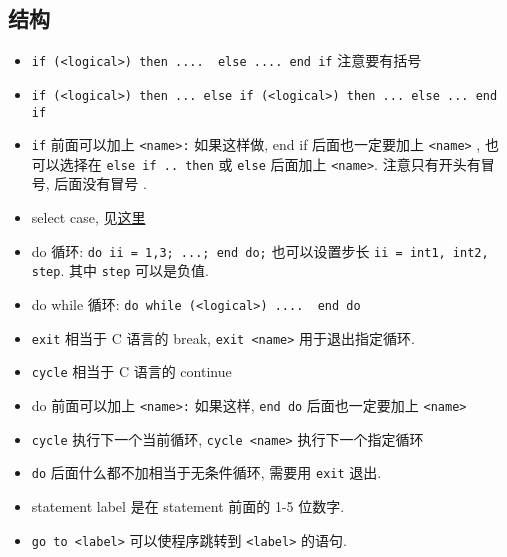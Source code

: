 \subsection{结构}
\begin{itemize}
\item \verb`if (<logical>) then ....  else .... end if` 注意要有括号
\item \verb`if (<logical>) then ... else if (<logical>) then ... else ... end if`
\item \verb`if` 前面可以加上 \verb`<name>:` 如果这样做,  end if 后面也一定要加上 \verb`<name>`  , 也可以选择在 \verb`else if .. then` 或 \verb`else` 后面加上 \verb`<name>`. 注意只有开头有冒号, 后面没有冒号 .
\item select case, 见\href{http://www.tutorialspoint.com/fortran/select_case_construct.htm}{这里}
\item do 循环:   \verb`do ii = 1,3; ...; end do;` 也可以设置步长 \verb`ii = int1, int2, step`. 其中 \verb`step` 可以是负值.
\item do while 循环: \verb`do while (<logical>) ....  end do`
\item \verb`exit` 相当于 C 语言的 break, \verb`exit <name>` 用于退出指定循环.
\item \verb`cycle` 相当于 C 语言的 continue
\item do 前面可以加上 \verb`<name>:` 如果这样, \verb`end do` 后面也一定要加上 \verb`<name>`
\item \verb`cycle` 执行下一个当前循环, \verb`cycle <name>` 执行下一个指定循环
\item \verb`do` 后面什么都不加相当于无条件循环, 需要用 \verb`exit` 退出.
\item statement label 是在 statement 前面的 1-5 位数字.
\item \verb`go to <label>` 可以使程序跳转到 \verb`<label>` 的语句.
\end{itemize}

